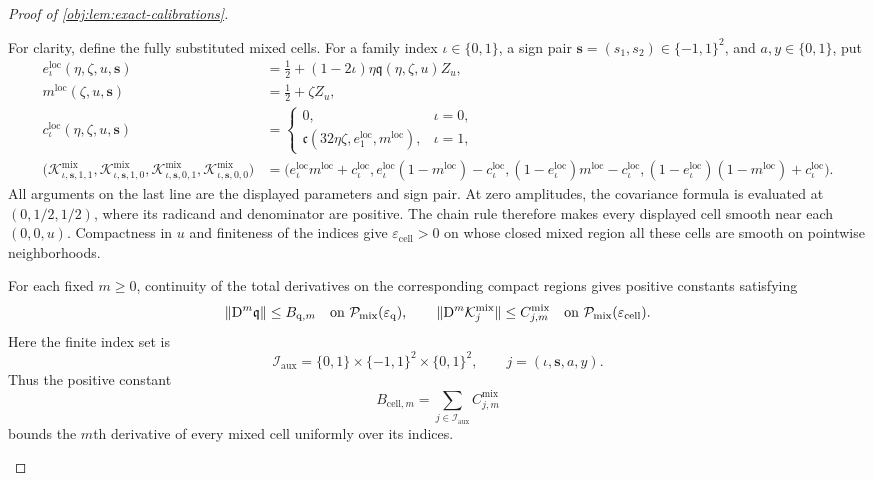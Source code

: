 \begin{proof}[Proof of \cref{obj:lem:exact-calibrations}]
\begin{enumerate}
For clarity, define the fully substituted mixed cells. For a family index
\(\iota\in\{0,1\}\), a sign pair
\(\boldsymbol{s}=(s_1,s_2)\in\{-1,1\}^2\), and
\(a,y\in\{0,1\}\), put
\[
\begin{aligned}
e_{\iota}^{\mathrm{loc}}(\eta,\zeta,u,\boldsymbol{s})
&=\frac12+(1-2\iota)\eta\mathfrak q(\eta,\zeta,u)Z_u,\\
m^{\mathrm{loc}}(\zeta,u,\boldsymbol{s})
&=\frac12+\zeta Z_u,\\
c_{\iota}^{\mathrm{loc}}(\eta,\zeta,u,\boldsymbol{s})
&=
\begin{cases}
0,&\iota=0,\\
\mathfrak c(32\eta\zeta,e_1^{\mathrm{loc}},m^{\mathrm{loc}}),
&\iota=1,
\end{cases}\\
\bigl(
\mathcal K^{\mathrm{mix}}_{\iota,\boldsymbol{s},1,1},
\mathcal K^{\mathrm{mix}}_{\iota,\boldsymbol{s},1,0},
\mathcal K^{\mathrm{mix}}_{\iota,\boldsymbol{s},0,1},
\mathcal K^{\mathrm{mix}}_{\iota,\boldsymbol{s},0,0}
\bigr)
&=
\bigl(
e_{\iota}^{\mathrm{loc}}m^{\mathrm{loc}}+c_{\iota}^{\mathrm{loc}},
e_{\iota}^{\mathrm{loc}}(1-m^{\mathrm{loc}})-c_{\iota}^{\mathrm{loc}},
(1-e_{\iota}^{\mathrm{loc}})m^{\mathrm{loc}}-c_{\iota}^{\mathrm{loc}},
(1-e_{\iota}^{\mathrm{loc}})(1-m^{\mathrm{loc}})
+c_{\iota}^{\mathrm{loc}}
\bigr).
\end{aligned}
\]
All arguments on the last line are the displayed parameters and sign pair. At zero amplitudes, the covariance formula is evaluated at
\((0,1/2,1/2)\), where its radicand and denominator are positive. The chain rule therefore makes every displayed cell smooth near each \((0,0,u)\). Compactness in \(u\) and finiteness of the indices give
\(\varepsilon_{\mathrm{cell}}>0\) on whose closed mixed region all these cells are smooth on pointwise neighborhoods.

For each fixed \(m\ge0\), continuity of the total derivatives on the corresponding compact regions gives positive constants satisfying
\[
\|\mathrm D^m\mathfrak q\|\le B_{\mathrm q,m}
\quad\hbox{on }\mathcal P_{\mathrm{mix}}(\varepsilon_{\mathrm q}),
\qquad
\|\mathrm D^m\mathcal K^{\mathrm{mix}}_j\|
\le C^{\mathrm{mix}}_{j,m}
\quad\hbox{on }\mathcal P_{\mathrm{mix}}(\varepsilon_{\mathrm{cell}}).
\]
Here the finite index set is
\[
\mathcal I_{\mathrm{aux}}
=\{0,1\}\times\{-1,1\}^2\times\{0,1\}^2,
\qquad
j=(\iota,\boldsymbol{s},a,y).
\]
Thus the positive constant
\[
B_{\mathrm{cell},m}
=\sum_{j\in\mathcal I_{\mathrm{aux}}}C^{\mathrm{mix}}_{j,m}
\]
bounds the \(m\)th derivative of every mixed cell uniformly over its indices.


\end{enumerate}
\end{proof}
